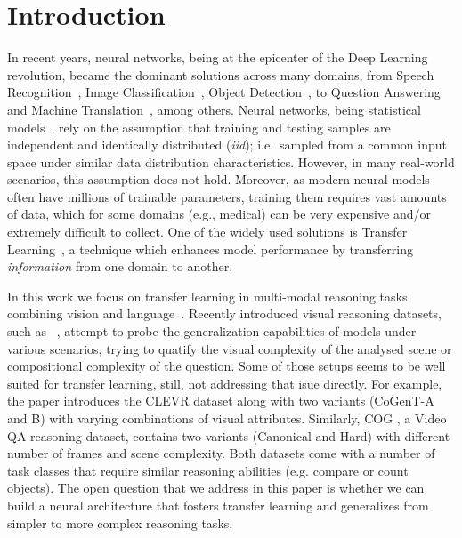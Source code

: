 \section{Introduction}
In recent years, neural networks, being at the epicenter of the Deep Learning~\cite{lecun2015deep} revolution, became the dominant solutions across many domains, from Speech Recognition~\cite{graves2013speech}, Image Classification~\cite{krizhevsky2012imagenet}, Object Detection~\cite{redmon2016you}, to Question Answering~\cite{weston2014memory} and Machine Translation~\cite{bahdanau2014neural}, among others.
Neural networks, being statistical models~\cite{ripley1993statistical,warner1996understanding}, rely on the assumption that training and testing samples are independent and identically distributed (\textit{iid}); i.e.\ sampled from a common input space under similar data distribution characteristics.
However, in many real-world scenarios, this assumption does not hold. Moreover, as modern neural models often have millions of trainable parameters, training them requires vast amounts of data, which for some domains (e.g., medical) can be very expensive and/or extremely difficult to collect.
One of the widely used solutions is Transfer Learning~\cite{pan2009survey,weiss2016survey}, a technique which enhances model performance by transferring \emph{information} from one domain to another.


In this work we focus on transfer learning in multi-modal reasoning tasks combining vision and language~\cite{mogadala2019trends}. Recently introduced visual reasoning datasets, such as ~\cite{johnson2017clevr,yang2018dataset,song2018explore}, attempt to probe the generalization capabilities of models under various scenarios, trying to quatify the visual complexity of the analysed scene or compositional complexity of the question.
Some of those setups seems to be well suited for transfer learning, still, not addressing that isue directly.
For example, the \cite{johnson2017clevr} paper introduces the CLEVR dataset along with two variants (CoGenT-A and B) with varying combinations of visual attributes.
Similarly, COG \cite{yang2018dataset}, a Video QA reasoning dataset, contains two variants (Canonical and Hard) with different number of frames and scene complexity.
Both datasets come with a number of task classes that require similar reasoning abilities (e.g. compare or count objects).
The open question that we address in this paper is whether we can build a neural architecture that fosters transfer learning and generalizes from simpler to more complex reasoning tasks.

